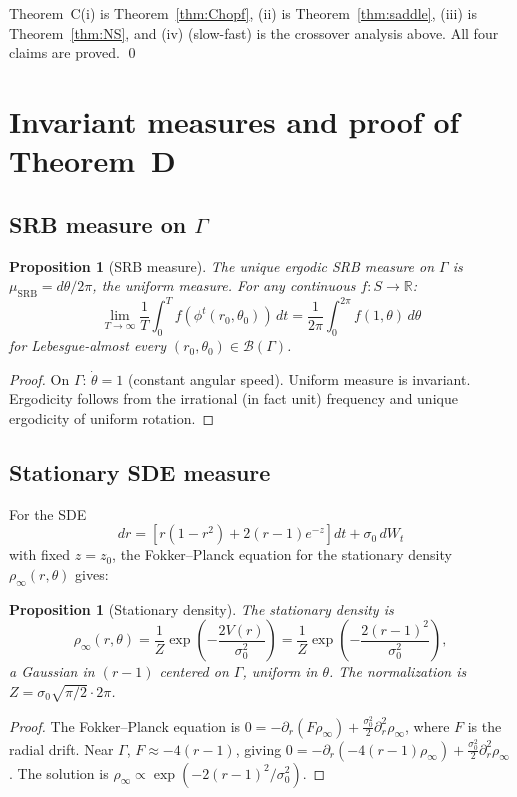 \documentclass[12pt, oneside]{book}
\theoremstyle{plain}
\newtheorem{proposition}[theorem]{Proposition}
\theoremstyle{definition}
\theoremstyle{remark}
\newcommand{\R}{\mathbb{R}}
\newcommand{\Orb}{\Gamma}
\newcommand{\cB}{\mathcal{B}}
\begin{document}
Theorem~C(i) is Theorem~\ref{thm:Chopf}, (ii) is Theorem~\ref{thm:saddle},
(iii) is Theorem~\ref{thm:NS}, and (iv) (slow-fast) is the crossover
analysis above. All four claims are proved. \qed

\section{Invariant measures and proof of Theorem~D}\label{sec:measures}

\subsection{SRB measure on \texorpdfstring{$\Orb$}{Gamma}}

\begin{proposition}[SRB measure]\label{prop:SRB}
The unique ergodic SRB measure on $\Orb$ is $\mu_{\mathrm{SRB}}=d\theta/2\pi$,
the uniform measure. For any continuous $f\colon S\to\R$:
\[
  \lim_{T\to\infty}\frac{1}{T}\int_0^T f(\phi^t(r_0,\theta_0))\,dt
  = \frac{1}{2\pi}\int_0^{2\pi}f(1,\theta)\,d\theta
\]
for Lebesgue-almost every $(r_0,\theta_0)\in\cB(\Orb)$.
\end{proposition}
\begin{proof}
On $\Orb$: $\dot\theta=1$ (constant angular speed). Uniform measure
is invariant. Ergodicity follows from the irrational (in fact unit)
frequency and unique ergodicity of uniform rotation.
\end{proof}

\subsection{Stationary SDE measure}

For the SDE
\[
  dr = \left[r(1-r^2)+2(r-1)e^{-z}\right]dt + \sigma_0\,dW_t
\]
with fixed $z=z_0$, the Fokker--Planck equation for the stationary
density $\rho_\infty(r,\theta)$ gives:

\begin{proposition}[Stationary density]\label{prop:stationary}
The stationary density is
\[
  \rho_\infty(r,\theta)
  = \frac{1}{Z}\exp\!\left(-\frac{2V(r)}{\sigma_0^2}\right)
  = \frac{1}{Z}\exp\!\left(-\frac{2(r-1)^2}{\sigma_0^2}\right),
\]
a Gaussian in $(r-1)$ centered on $\Orb$, uniform in $\theta$.
The normalization is $Z=\sigma_0\sqrt{\pi/2}\cdot 2\pi$.
\end{proposition}
\begin{proof}
The Fokker--Planck equation is $0=-\partial_r(F\rho_\infty)
+\frac{\sigma_0^2}{2}\partial_r^2\rho_\infty$, where $F$ is the
radial drift. Near $\Orb$, $F\approx -4(r-1)$, giving
$0=-\partial_r(-4(r-1)\rho_\infty)+\frac{\sigma_0^2}{2}\partial_r^2\rho_\infty$.
The solution is $\rho_\infty\propto\exp(-2(r-1)^2/\sigma_0^2)$.
\end{proof}
\end{document}
